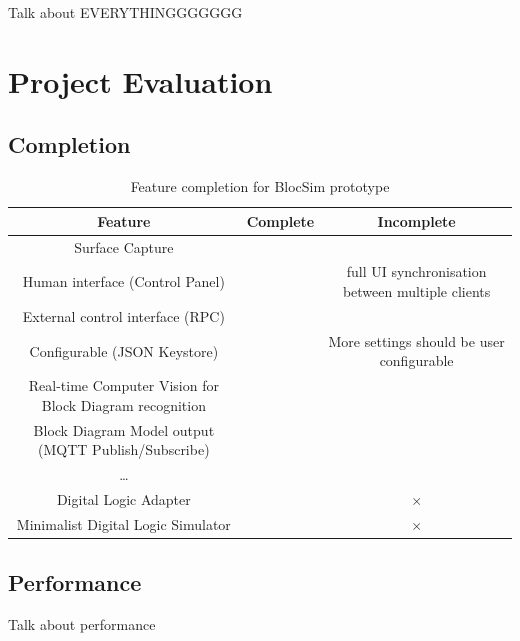 \documentclass[titlesmallcaps, examinerscopy, copyrightpage]{uqthesis}
\newcommand{\tick}{\checkmark}
\newcommand{\gtick}{\color{ForestGreen} \tick }
\newcommand{\cross}{$\times$ }
\newcommand{\rcross}{\color{red} \cross }
\begin{document}
Talk about EVERYTHINGGGGGGG





\chapter{Project Evaluation}




\section{Completion}



\begin{table}[ht!]
	\center
	\begin{tabular}{c|c|c}
		\hline
		Feature & Complete & Incomplete \\
		\hline
		Surface Capture & \gtick & \\
		Human interface (Control Panel) & \gtick & full UI synchronisation between multiple clients \\
		External control interface (RPC) & \gtick & \\
		Configurable (JSON Keystore) & \gtick & More settings should be user configurable \\
		Real-time Computer Vision for \newline Block Diagram recognition & \gtick & \\
		Block Diagram Model output \newline (MQTT Publish/Subscribe) & \gtick & \\
		\ldots & & \\
		Digital Logic Adapter & & \rcross \\
		Minimalist Digital Logic Simulator & & \rcross \\
		\hline
	\end{tabular}
	\caption{Feature completion for BlocSim prototype}
	\label{tab:completion}
\end{table} 

\newpage

\section{Performance}

Talk about performance
\end{document}
